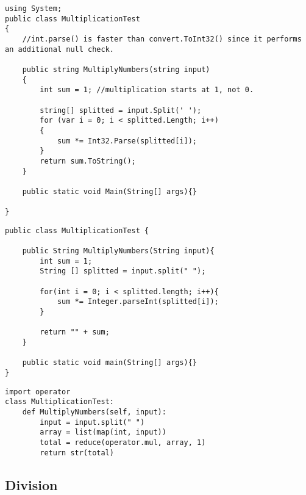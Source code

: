 	\lstset{style=sharpc}
	\begin{lstlisting}
using System;
public class MultiplicationTest
{
    //int.parse() is faster than convert.ToInt32() since it performs an additional null check.

    public string MultiplyNumbers(string input)
    {
        int sum = 1; //multiplication starts at 1, not 0.

        string[] splitted = input.Split(' ');
        for (var i = 0; i < splitted.Length; i++)
        {
            sum *= Int32.Parse(splitted[i]);
        }
        return sum.ToString();
    }
	
	public static void Main(String[] args){}

}
	\end{lstlisting}

	\lstset{style=java}
	\begin{lstlisting}
public class MultiplicationTest {
	
	public String MultiplyNumbers(String input){
		int sum = 1;
		String [] splitted = input.split(" ");
		
		for(int i = 0; i < splitted.length; i++){
			sum *= Integer.parseInt(splitted[i]);
		}
		
		return "" + sum;
	}
	
	public static void main(String[] args){}
}
	\end{lstlisting}


	\lstset{style=python}
	\begin{lstlisting}
import operator
class MultiplicationTest:
    def MultiplyNumbers(self, input):
        input = input.split(" ")
        array = list(map(int, input))
        total = reduce(operator.mul, array, 1)
        return str(total)
	\end{lstlisting}


\subsection{Division}


